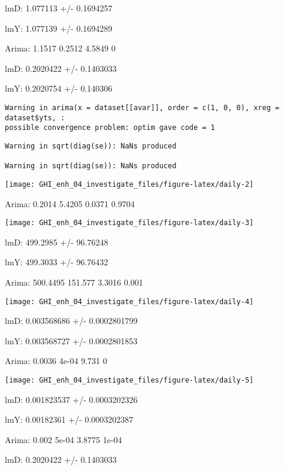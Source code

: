 \documentclass[
  10pt,
  a4paper,oneside]{article}
\begin{document}
lmD: 1.077113 +/- 0.1694257

lmY: 1.077139 +/- 0.1694289

Arima: 1.1517 0.2512 4.5849 0

lmD: 0.2020422 +/- 0.1403033

lmY: 0.2020754 +/- 0.140306

\begin{verbatim}
Warning in arima(x = dataset[[avar]], order = c(1, 0, 0), xreg = dataset$yts, :
possible convergence problem: optim gave code = 1
\end{verbatim}

\begin{verbatim}
Warning in sqrt(diag(se)): NaNs produced

Warning in sqrt(diag(se)): NaNs produced
\end{verbatim}

\begin{center}\texttt{[image: GHI\_enh\_04\_investigate\_files/figure-latex/daily-2]} \end{center}

Arima: 0.2014 5.4205 0.0371 0.9704

\begin{center}\texttt{[image: GHI\_enh\_04\_investigate\_files/figure-latex/daily-3]} \end{center}

lmD: 499.2985 +/- 96.76248

lmY: 499.3033 +/- 96.76432

Arima: 500.4495 151.577 3.3016 0.001

\begin{center}\texttt{[image: GHI\_enh\_04\_investigate\_files/figure-latex/daily-4]} \end{center}

lmD: 0.003568686 +/- 0.0002801799

lmY: 0.003568727 +/- 0.0002801853

Arima: 0.0036 4e-04 9.731 0

\begin{center}\texttt{[image: GHI\_enh\_04\_investigate\_files/figure-latex/daily-5]} \end{center}

lmD: 0.001823537 +/- 0.0003202326

lmY: 0.00182361 +/- 0.0003202387

Arima: 0.002 5e-04 3.8775 1e-04

lmD: 0.2020422 +/- 0.1403033
\end{document}
